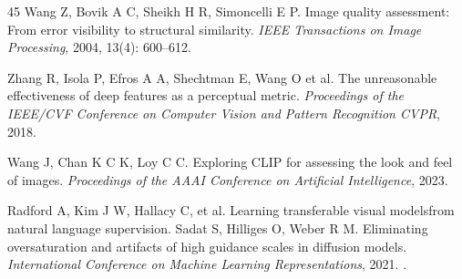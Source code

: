 \documentclass[times,twocolumn,final]{elsarticle}
\providecommand{\DIFadd}[1]{{\protect\color{blue} \sf #1}} %
\providecommand{\DIFdel}[1]{{\protect\color{red} \scriptsize #1}} %
\providecommand{\DIFaddbegin}{} %
\providecommand{\DIFaddend}{} %
\providecommand{\DIFdelbegin}{} %
\providecommand{\DIFdelend}{} %
\begin{document}
\begin{thebibliography}{45}
\DIFdelend {}
Wang Z, Bovik A C, Sheikh H R, Simoncelli E P. Image quality assessment: From error visibility to structural similarity. \textit{IEEE Transactions on Image Processing}, 2004, 13(4): 600--612.

Zhang R, Isola P, Efros A A, \DIFdelbegin \DIFdel{Shechtman E, Wang O}\DIFdelend \DIFaddbegin \DIFadd{et al}\DIFaddend . The unreasonable effectiveness of deep features as a perceptual metric. \textit{\DIFdelbegin \DIFdel{Proceedings of the IEEE/CVF Conference on Computer Vision and Pattern Recognition}\DIFdelend \DIFaddbegin \DIFadd{CVPR}\DIFaddend }, 2018.

\DIFdelbegin %
\DIFdel{Wang J, Chan K C K, Loy C C. Exploring CLIP for assessing the look and feel of images. \textit{Proceedings of the AAAI Conference on Artificial Intelligence}, 2023.
}%

\DIFdel{Radford A, Kim J W, Hallacy C, et al. Learning transferable visual modelsfrom natural language supervision. }\DIFdelend \DIFaddbegin {}
\DIFadd{Sadat S, Hilliges O, Weber R M. Eliminating oversaturation and artifacts of high guidance scales in diffusion models. }\DIFaddend \textit{International Conference on \DIFdelbegin \DIFdel{Machine }\DIFdelend Learning \DIFaddbegin \DIFadd{Representations}\DIFaddend }, \DIFdelbegin \DIFdel{2021.
}\DIFdelend \DIFaddbegin \DIFadd{2025.
}\DIFaddend 

\end{thebibliography}
\DIFaddbegin \endgroup
 \DIFaddend
\end{document}
